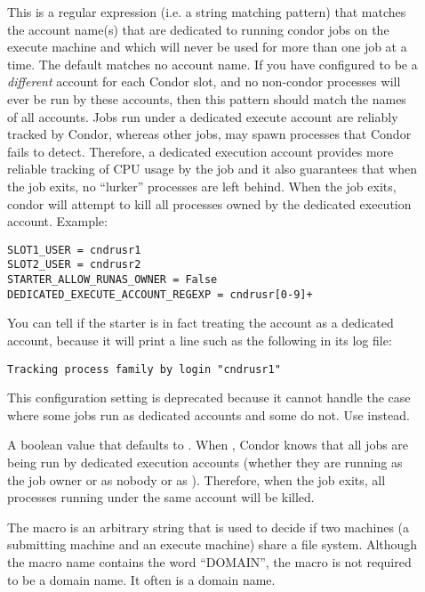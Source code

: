 \begin{description}
\item[]
  \label{param:DedicatedExecuteAccountRegexp}
  This is a regular expression (i.e. a string matching pattern) that
  matches the account name(s) that are dedicated to running condor
  jobs on the execute machine and which will never be used for more
  than one job at a time.  The default matches no account name.  If
  you have configured  to be a \emph{different}
  account for each Condor slot, and no non-condor processes will ever be
  run by these accounts, then this pattern should match the names of
  all  accounts.  Jobs run under a dedicated
  execute account are reliably tracked by Condor, whereas other jobs,
  may spawn processes that Condor fails to detect.  Therefore, a
  dedicated execution account provides more reliable tracking of CPU
  usage by the job and it also guarantees that when the job exits, no
  ``lurker'' processes are left behind.  When the job exits, condor
  will attempt to kill all processes owned by the dedicated execution
  account.  Example:

\begin{verbatim}
SLOT1_USER = cndrusr1
SLOT2_USER = cndrusr2
STARTER_ALLOW_RUNAS_OWNER = False
DEDICATED_EXECUTE_ACCOUNT_REGEXP = cndrusr[0-9]+
\end{verbatim}

  You can tell if the starter is in fact treating the account as a
  dedicated account, because it will print a line such as the following
  in its log file:

\begin{verbatim}
Tracking process family by login "cndrusr1"
\end{verbatim}


\item[]
  \label{param:ExecuteLoginIsDedicated}
  This configuration setting is deprecated because it cannot handle the
  case where some jobs run as dedicated accounts and some do not.  Use
   instead.

  A boolean value that defaults to .  When ,
  Condor knows that all jobs are being run by dedicated execution
  accounts (whether they are running as the job owner or as nobody or as
  ).  Therefore, when the job exits, all processes
  running under the same account will be killed.

\item[] \label{param:FilesystemDomain}
  The 
  macro is an arbitrary string that is used to decide if
  two machines (a submitting machine and an execute machine) share a
  file system.
  Although the macro name contains the word ``DOMAIN'',
  the macro is not required to be a domain name. 
  It often is a domain name.


\end{description}
